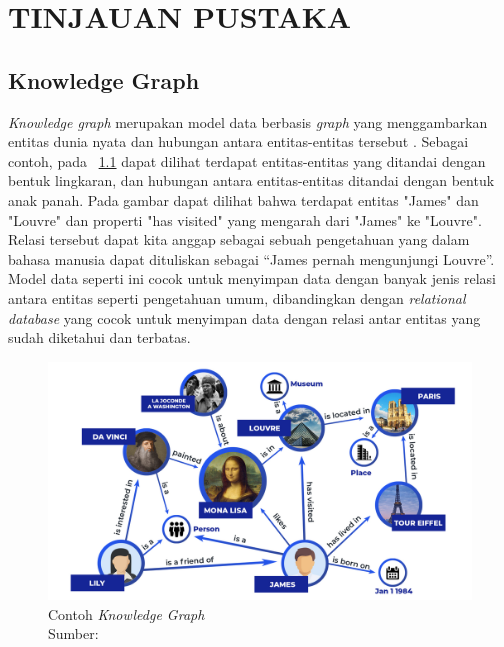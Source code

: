 \chapter{TINJAUAN PUSTAKA}
\label{chap:2}

\section{Knowledge Graph}
\label{sec:knowledge-graph}

\textit{Knowledge graph} merupakan model data berbasis \textit{graph} yang menggambarkan entitas
dunia nyata dan hubungan antara entitas-entitas tersebut \citep{seth_2019}. Sebagai contoh, pada
\pic~\ref{fig:kg-description} dapat dilihat terdapat entitas-entitas yang ditandai dengan bentuk
lingkaran, dan hubungan antara entitas-entitas ditandai dengan bentuk anak panah. Pada gambar dapat
dilihat bahwa terdapat entitas "James" dan "Louvre" dan properti "has visited" yang mengarah dari
"James" ke "Louvre". Relasi tersebut dapat kita anggap sebagai sebuah pengetahuan yang dalam bahasa
manusia dapat dituliskan sebagai ``James pernah mengunjungi Louvre''. Model data seperti ini cocok
untuk menyimpan data dengan banyak jenis relasi antara entitas seperti pengetahuan umum,
dibandingkan dengan \textit{relational database} yang cocok untuk menyimpan data dengan relasi antar
entitas yang sudah diketahui dan terbatas.

\begin{figure}[H]
  \centering
  \includegraphics[width=\textwidth]{pictures/knowledge_graph.jpg}
  \caption[Contoh \textit{Knowledge Graph}]{Contoh \textit{Knowledge Graph}\\Sumber: \citep{seth_2019}}
  \label{fig:kg-description}
\end{figure}


